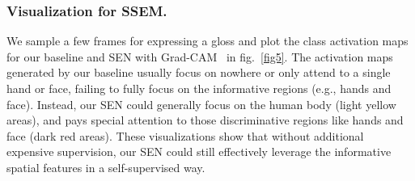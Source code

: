 \documentclass[letterpaper]{article} \usepackage{aaai23}  \usepackage{times}  \usepackage{helvet}  \usepackage{courier}  \usepackage[hyphens]{url}  \usepackage{graphicx} \urlstyle{rm} \def\UrlFont{\rm}  \usepackage{natbib}  \usepackage{caption} \frenchspacing  \setlength{\pdfpagewidth}{8.5in} \setlength{\pdfpageheight}{11in} \usepackage{algorithm}
\begin{document}
\subsubsection{Visualization for SSEM.}
We sample a few frames for expressing a gloss and plot the class activation maps for our baseline and SEN with Grad-CAM~\cite{selvaraju2017grad} in fig.~\ref{fig5}. The activation maps generated by our baseline usually focus on nowhere or only attend to a single hand or face, failing to fully focus on the informative regions (e.g., hands and face). Instead, our SEN could generally focus on the human body (light yellow areas), and pays special attention to those discriminative regions like hands and face (dark red areas). These visualizations show that without additional expensive supervision, our SEN could still effectively leverage the informative spatial features in a self-supervised way.
\end{document}
